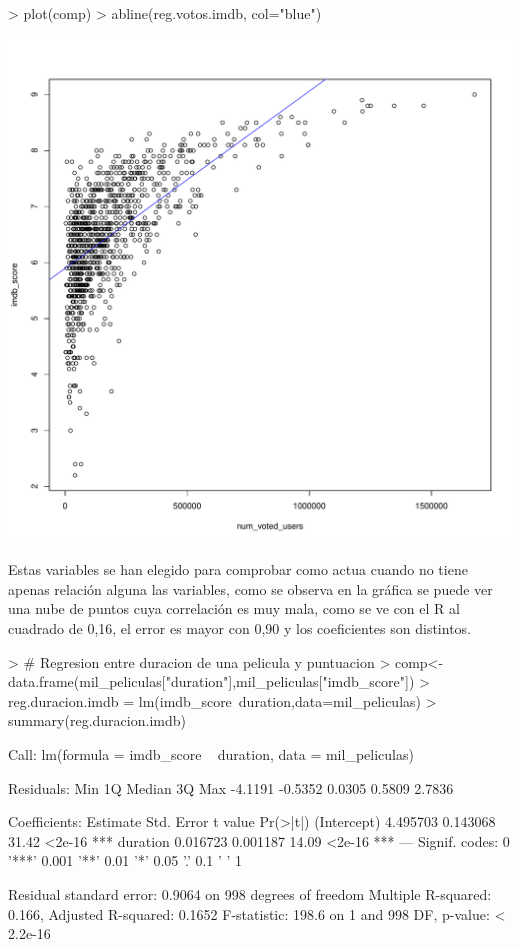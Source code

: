 \documentclass[a4paper]{article}
\begin{document}
\begin{Schunk}
\begin{Sinput}
> plot(comp)
> abline(reg.votos.imdb, col="blue")
\end{Sinput}
\end{Schunk}
\includegraphics{practica-3-regresion1}

Estas variables se han elegido para comprobar como actua cuando no tiene apenas relación alguna las variables, como se observa en la gráfica se puede ver una nube de puntos cuya correlación es muy mala, como se ve con el R al cuadrado de 0,16, el error es mayor con 0,90 y los coeficientes son distintos.
\begin{Schunk}
\begin{Sinput}
> # Regresion entre duracion de una pelicula y puntuacion
> comp<-data.frame(mil_peliculas["duration"],mil_peliculas["imdb_score"])
> reg.duracion.imdb = lm(imdb_score~duration,data=mil_peliculas)
> summary(reg.duracion.imdb)
\end{Sinput}
\begin{Soutput}
Call:
lm(formula = imdb_score ~ duration, data = mil_peliculas)

Residuals:
    Min      1Q  Median      3Q     Max 
-4.1191 -0.5352  0.0305  0.5809  2.7836 

Coefficients:
            Estimate Std. Error t value Pr(>|t|)    
(Intercept) 4.495703   0.143068   31.42   <2e-16 ***
duration    0.016723   0.001187   14.09   <2e-16 ***
---
Signif. codes:  0 '***' 0.001 '**' 0.01 '*' 0.05 '.' 0.1 ' ' 1

Residual standard error: 0.9064 on 998 degrees of freedom
Multiple R-squared:  0.166,	Adjusted R-squared:  0.1652 
F-statistic: 198.6 on 1 and 998 DF,  p-value: < 2.2e-16
\end{Soutput}
\end{Schunk}
\end{document}
